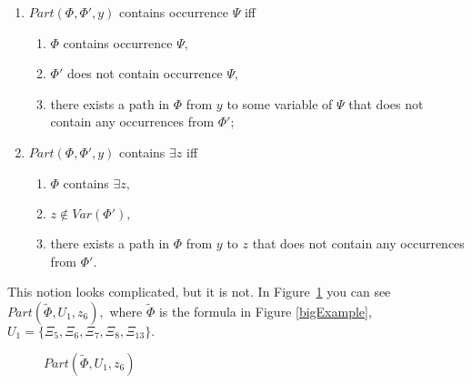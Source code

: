 \documentclass{au}
\theoremstyle{plain}
\theoremstyle{definition}
\theoremstyle{remark}
\numberwithin{equation}{section}
\begin{document}
\begin{enumerate}

\item $Part(\Phi,\Phi',y)$ contains occurrence $\Psi$ iff
\begin{enumerate}

\item $\Phi$ contains occurrence $\Psi,$

\item $\Phi'$ does not contain occurrence $\Psi,$

\item 
there exists a path in $\Phi$ from $y$ to some variable of $\Psi$
that does not contain any occurrences from $\Phi';$

\end{enumerate}

\item $Part(\Phi,\Phi',y)$ contains $\exists z$ iff

\begin{enumerate}

\item
$\Phi$ contains $\exists z,$

\item
$z\notin Var(\Phi'),$

\item
there exists a path in $\Phi$ from $y$ to $z$ that does not contain any occurrences from $\Phi'.$

\end{enumerate}

\end{enumerate}

This notion looks complicated, but it is not. In Figure~\ref{partExample} you
can see $Part(\widetilde \Phi, U_{1}, z_{6}),$
where $\widetilde \Phi$ is the formula in Figure \ref{bigExample},
$U_{1} = \{\Xi_{5},\Xi_{6},\Xi_{7},\Xi_{8},\Xi_{13}\}.$

\begin{figure}
\centerline{
}
\caption{$Part(\widetilde \Phi, U_{1}, z_{6})$}\label{partExample}
\end{figure}
\end{document}
